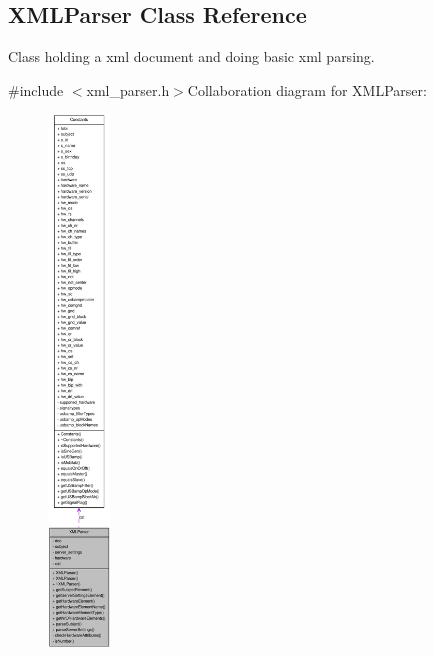 \hypertarget{class_x_m_l_parser}{
\subsection{XMLParser Class Reference}
\label{class_x_m_l_parser}
}


Class holding a xml document and doing basic xml parsing.  


{\ttfamily \#include $<$xml\_\-parser.h$>$}Collaboration diagram for XMLParser:\nopagebreak
\begin{figure}[H]
\begin{center}
\leavevmode
\includegraphics[height=400pt]{class_x_m_l_parser__coll__graph}
\end{center}
\end{figure}
